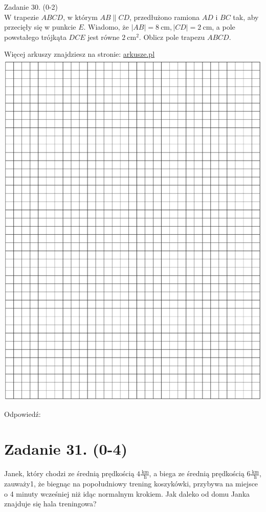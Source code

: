 \documentclass[10pt]{article}
\begin{document}
Zadanie 30. (0-2)\\
W trapezie \(A B C D\), w którym \(A B \| C D\), przedłużono ramiona \(A D\) i \(B C\) tak, aby przecięły się w punkcie \(E\). Wiadomo, że \(|A B|=8 \mathrm{~cm},|C D|=2 \mathrm{~cm}\), a pole powstałego trójkąta \(D C E\) jest równe \(2 \mathrm{~cm}^{2}\). Oblicz pole trapezu \(A B C D\).

Więcej arkuszy znajdziesz na stronie: \href{http://arkusze.pl}{arkusze.pl}\\
\includegraphics[max width=\textwidth, center]{2024_11_21_4a1915d79134dda0750eg-16}

Odpowiedź:

\section*{Zadanie 31. (0-4)}
Janek, który chodzi ze średnią prędkością \(4 \frac{\mathrm{~km}}{\mathrm{~h}}\), a biega ze średnią prędkością \(6 \frac{\mathrm{~km}}{\mathrm{~h}}\), zauważy1, że biegnąc na popołudniowy trening koszykówki, przybywa na miejsce o 4 minuty wcześniej niż idąc normalnym krokiem. Jak daleko od domu Janka znajduje się hala treningowa?
\end{document}
